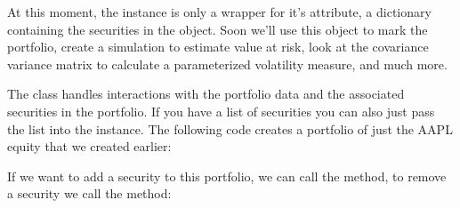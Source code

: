 \documentclass[letterpaper,10pt,english]{sphinxmanual}
\begin{document}
\sphinxAtStartPar
At this moment, the  instance is only a wrapper for
it’s  attribute, a dictionary containing the securities in the
 object. Soon we’ll use this object to mark the portfolio,
create a simulation to estimate value at risk, look at the covariance
variance matrix to calculate a parameterized volatility measure, and
much more.

\sphinxAtStartPar
The  class handles interactions with the portfolio data and
the associated securities in the portfolio. If you have a list of
securities you can also just pass the list into the 
instance. The following code creates a portfolio of just the AAPL equity
that we created earlier:

\begin{sphinxVerbatim}[commandchars=\\\{\}]
  \PYG{p}{[}\PYG{p}{]}
\end{sphinxVerbatim}

\sphinxAtStartPar
If we want to add a security to this portfolio, we can call the
 method, to remove a security we call the
 method:
\end{document}

